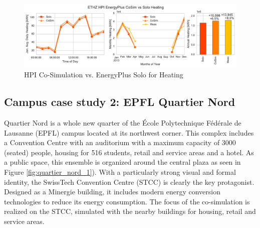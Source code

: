 \documentclass{tBPS2e}
\theoremstyle{plain}
\theoremstyle{definition}
\theoremstyle{remark}
\begin{document}
\begin{figure}[H]
\centering
\includegraphics[scale=0.55]{figures/HPI_EnergyPlus_Heating}
\caption{HPI Co-Simulation vs. EnergyPlus Solo for Heating}
\label{fig:hpi_energyplusheating}
\end{figure}








\subsection{Campus case study 2: EPFL Quartier Nord} 
Quartier Nord is a whole new quarter of the École Polytechnique Fédérale de
Lausanne (EPFL) campus located at its northwest corner. This complex includes
a Convention Centre with an auditorium with a maximum capacity of 3000
(seated) people, housing for 516 students, retail and service areas and a
hotel. As a public space, this ensemble is organized around the central plaza as
seen in Figure \ref{fig:quartier_nord_1}). With a particularly strong visual and formal identity, the SwissTech
Convention Centre (STCC) is clearly the key protagonist.  Designed as a
Minergie building, it includes modern energy conversion
technologies to reduce its energy consumption. The focus of the co-simulation
is realized on the STCC, simulated with the nearby buildings for housing,
retail and service areas.
\end{document}
